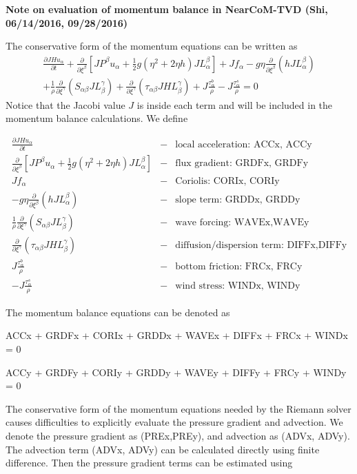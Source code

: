 \documentclass[11pt]{article}
\newcommand{\ba}{\begin{eqnarray}}
\newcommand{\ea}{\end{eqnarray}}
\begin{document}
{\bf Note on evaluation of momentum balance in NearCoM-TVD (Shi, 06/14/2016, 09/28/2016)}

The conservative form of the momentum equations can be written as
\ba
\nonumber
\frac{\partial JHu_\alpha}{\partial t} +  \frac{\partial }{\partial \xi^\beta} \left[ JP^\beta u_\alpha  +\frac{1}{2} g (\eta^2 +2 \eta h)  J L^\beta_\alpha \right] +J f_\alpha -  g \eta \frac{\partial }{\partial \xi^\beta} (h J L^\beta_\alpha)  \\
+ \frac{1}{\rho}   \frac{\partial }{\partial \xi^\gamma} (S_{\alpha \beta} J L^\gamma_\beta) 
+  \frac{\partial }{\partial \xi^\gamma} (\tau_{\alpha \beta} JHL^\gamma_\beta)
+ J \frac{\tau^b_\alpha}{\rho} -  J \frac{\tau^s_\alpha}{\rho} = 0 
\label{conserv1}
\ea
Notice that the Jacobi value $J$ is inside each term and will be included in the momentum balance calculations. We define

\ba
\nonumber 
\frac{\partial JHu_\alpha}{\partial t} &-& \mbox{local acceleration: ACCx, ACCy} \\
\nonumber
 \frac{\partial }{\partial \xi^\beta} \left[ JP^\beta u_\alpha  +\frac{1}{2} g (\eta^2 +2 \eta h)  J L^\beta_\alpha \right]  &-& \mbox{flux gradient: GRDFx, GRDFy}\\
 \nonumber
 J f_\alpha  &-& \mbox{Coriolis: CORIx, CORIy}\\
 \nonumber
 -  g \eta \frac{\partial }{\partial \xi^\beta} (h J L^\beta_\alpha)  &-& \mbox{slope term: GRDDx, GRDDy}\\
 \nonumber
 \frac{1}{\rho}   \frac{\partial }{\partial \xi^\gamma} (S_{\alpha \beta} J L^\gamma_\beta) &-& \mbox{wave forcing: WAVEx,WAVEy} \\
 \nonumber
  \frac{\partial }{\partial \xi^\gamma} (\tau_{\alpha \beta} JHL^\gamma_\beta) &-& \mbox{diffusion/dispersion term: DIFFx,DIFFy} \\
  \nonumber 
 J \frac{\tau^b_\alpha}{\rho}  &-& \mbox{bottom friction: FRCx, FRCy} \\
 \nonumber 
 -  J \frac{\tau^s_\alpha}{\rho}  &-& \mbox{wind stress: WINDx, WINDy} 
\ea

The momentum balance equations can be denoted as

ACCx + GRDFx  + CORIx + GRDDx + WAVEx + DIFFx + FRCx + WINDx = 0

ACCy + GRDFy  + CORIy + GRDDy + WAVEy + DIFFy + FRCy + WINDy = 0


The conservative form of the momentum equations needed by the Riemann solver causes difficulties to explicitly evaluate the pressure gradient and advection. We denote the pressure gradient as (PREx,PREy), and advection as (ADVx, ADVy). The advection term (ADVx, ADVy) can be calculated directly using finite difference. Then the pressure gradient terms can be estimated using
\end{document}
